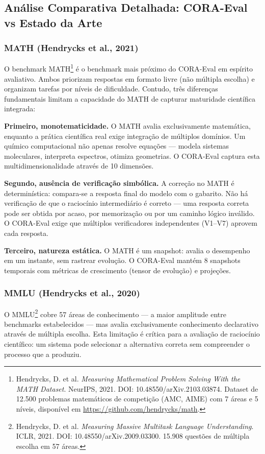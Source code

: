 \subsection{Análise Comparativa Detalhada: CORA-Eval vs Estado da Arte}

\subsubsection{MATH (Hendrycks et al., 2021)}

O benchmark MATH\footnote{Hendrycks, D. et al. \textit{Measuring Mathematical
Problem Solving With the MATH Dataset}. NeurIPS, 2021. DOI:
10.48550/arXiv.2103.03874. Dataset de 12.500 problemas matemáticos de
competição (AMC, AIME) com 7 áreas e 5 níveis, disponível em
\url{https://github.com/hendrycks/math}.} é o benchmark mais próximo do
CORA-Eval em espírito avaliativo. Ambos priorizam respostas em formato
livre (não múltipla escolha) e organizam tarefas por níveis de dificuldade.
Contudo, três diferenças fundamentais limitam a capacidade do MATH de capturar
maturidade científica integrada:

\textbf{Primeiro, monotematicidade.} O MATH avalia exclusivamente matemática,
enquanto a prática científica real exige integração de múltiplos domínios. Um
químico computacional não apenas resolve equações --- modela sistemas
moleculares, interpreta espectros, otimiza geometrias. O CORA-Eval captura
esta multidimensionalidade através de 10 dimensões.

\textbf{Segundo, ausência de verificação simbólica.} A correção no MATH é
determinística: compara-se a resposta final do modelo com o gabarito. Não há
verificação de que o raciocínio intermediário é correto --- uma resposta
correta pode ser obtida por acaso, por memorização ou por um caminho lógico
inválido. O CORA-Eval exige que múltiplos verificadores independentes
(V1--V7) aprovem cada resposta.

\textbf{Terceiro, natureza estática.} O MATH é um snapshot: avalia o desempenho
em um instante, sem rastrear evolução. O CORA-Eval mantém 8 snapshots
temporais com métricas de crescimento (tensor de evolução) e projeções.

\subsubsection{MMLU (Hendrycks et al., 2020)}

O MMLU\footnote{Hendrycks, D. et al. \textit{Measuring Massive Multitask
Language Understanding}. ICLR, 2021. DOI: 10.48550/arXiv.2009.03300.
15.908 questões de múltipla escolha em 57 áreas.} cobre 57 áreas de
conhecimento --- a maior amplitude entre benchmarks estabelecidos --- mas
avalia exclusivamente conhecimento declarativo através de múltipla escolha.
Esta limitação é crítica para a avaliação de raciocínio científico: um
sistema pode selecionar a alternativa correta sem compreender o processo
que a produziu.

